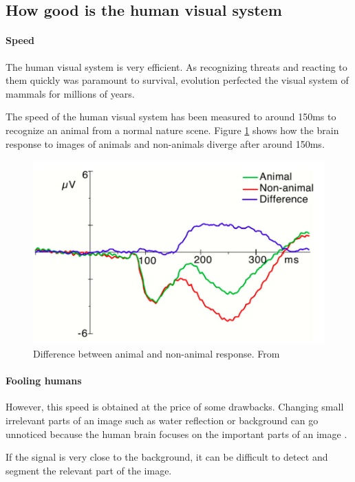 \documentclass{article}
\begin{document}
\subsection{How good is the human visual system}
\paragraph{Speed}
The human visual system is very efficient. As recognizing threats and reacting to them quickly was paramount to survival, evolution perfected the visual system of mammals for millions of years.

The speed of the human visual system has been measured \cite{speed} to around 150ms to recognize an animal from a normal nature scene. Figure \ref{fig:speed} shows how the brain response to images of animals and non-animals diverge after around 150ms.

\begin{figure}[h]
\begin{center}
\centerline{\includegraphics[width=0.8\columnwidth]{speed.png}}
\caption{Difference between animal and non-animal response. From \cite{speed}}
\label{fig:speed}
\end{center}
\end{figure} 


\paragraph{Fooling humans}
However, this speed is obtained at the price of some drawbacks. Changing small irrelevant parts of an image such as water reflection or background can go unnoticed because the human brain focuses on the important parts of an image \cite{failure}.

If the signal is very close to the background, it can be difficult to detect and segment the relevant part of the image.
\end{document}
